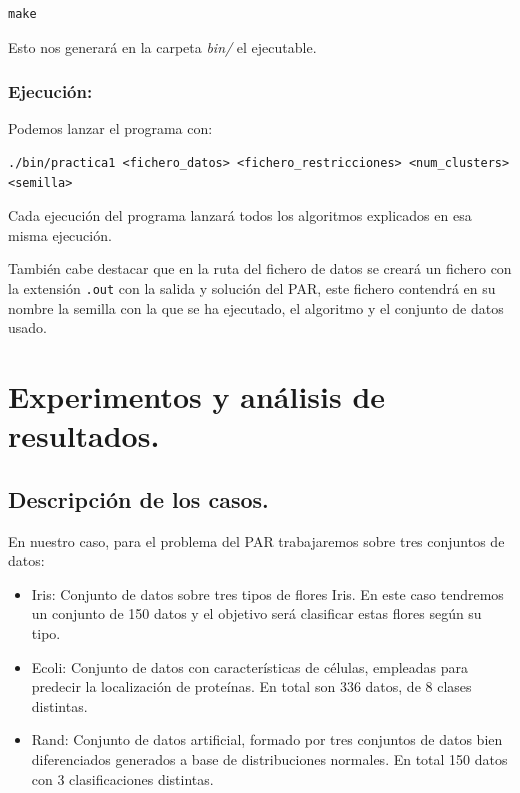 \documentclass[12pt, spanish]{article}
\begin{document}
\begin{lstlisting}
make
\end{lstlisting}

Esto nos generará en la carpeta \textit{bin/} el ejecutable.


\subsubsection{Ejecución:}

Podemos lanzar el programa con:

\begin{lstlisting}
./bin/practica1 <fichero_datos> <fichero_restricciones> <num_clusters> <semilla>
\end{lstlisting}

Cada ejecución del programa lanzará todos los algoritmos explicados en esa misma ejecución.

También cabe destacar que en la ruta del fichero de datos se creará un fichero con la extensión \texttt{.out} con la salida y solución del PAR, este fichero contendrá en su nombre la semilla con la que se ha ejecutado, el algoritmo y el conjunto de datos usado.




\section{Experimentos y análisis de resultados.}


\subsection{Descripción de los casos.}

En nuestro caso, para el problema del PAR trabajaremos sobre tres conjuntos de datos:

\begin{itemize}
	\item{Iris: Conjunto de datos sobre tres tipos de flores Iris. En este caso tendremos un conjunto de 150 datos y el objetivo será clasificar estas flores según su tipo.}
	\item{Ecoli: Conjunto de datos con características de células, empleadas para predecir la localización de proteínas. En total son 336 datos, de 8 clases distintas.}
	\item{Rand: Conjunto de datos artificial, formado por tres conjuntos de datos bien diferenciados generados a base de distribuciones normales. En total 150 datos con 3 clasificaciones distintas.}
\end{itemize}
\end{document}
